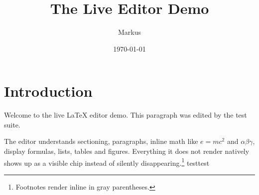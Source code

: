 \documentclass[a4paper,11pt]{article}
\title{The Live Editor Demo}
\author{Markus}
\date{\today}
\begin{document}
\maketitle


\section{Introduction}

Welcome to the live LaTeX editor demo. This paragraph was edited by the test suite.

The editor understands sectioning, paragraphs, inline math like
$e = mc^2$ and $\alpha \beta \gamma$, display formulas, lists, tables
and figures. Everything it does not render natively shows up as a
visible chip instead of silently disappearing.\footnote{Footnotes
render inline in gray parentheses.} testtest





\end{document}
